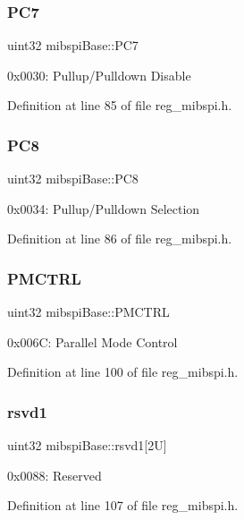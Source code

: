 \subsubsection{\texorpdfstring{P\+C7}{PC7}}
{\footnotesize\ttfamily uint32 mibspi\+Base\+::\+P\+C7}

0x0030\+: Pullup/\+Pulldown Disable 

Definition at line 85 of file reg\+\_\+mibspi.\+h.

\mbox{\label{structmibspiBase_ac5c9737d8d33dd35c18ca969fbc9c086}} 
\subsubsection{\texorpdfstring{P\+C8}{PC8}}
{\footnotesize\ttfamily uint32 mibspi\+Base\+::\+P\+C8}

0x0034\+: Pullup/\+Pulldown Selection 

Definition at line 86 of file reg\+\_\+mibspi.\+h.

\mbox{\label{structmibspiBase_a78511a92f9e152f2e18dba72eea560f9}} 
\subsubsection{\texorpdfstring{P\+M\+C\+T\+RL}{PMCTRL}}
{\footnotesize\ttfamily uint32 mibspi\+Base\+::\+P\+M\+C\+T\+RL}

0x006C\+: Parallel Mode Control 

Definition at line 100 of file reg\+\_\+mibspi.\+h.

\mbox{\label{structmibspiBase_abbb7e87f75ef1931dd2ebcf0f35bdd29}} 
\subsubsection{\texorpdfstring{rsvd1}{rsvd1}}
{\footnotesize\ttfamily uint32 mibspi\+Base\+::rsvd1\mbox{[}2\+U\mbox{]}}

0x0088\+: Reserved 

Definition at line 107 of file reg\+\_\+mibspi.\+h.

